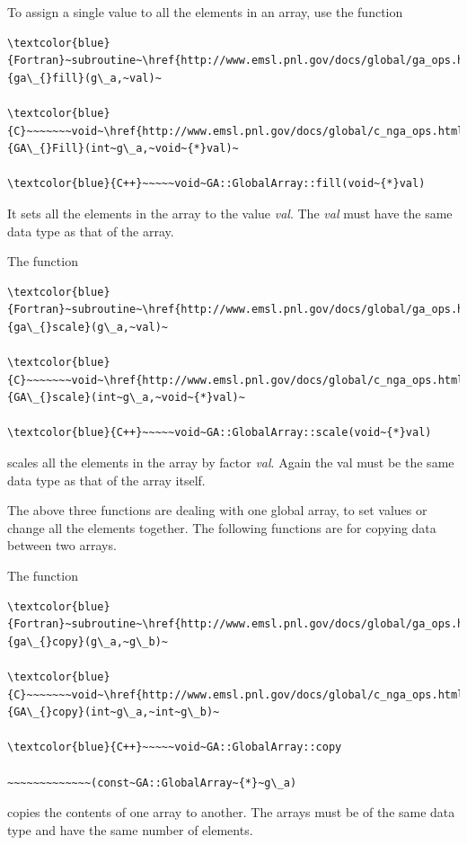 To assign a single value to all the elements in an array, use the
function
\begin{verbatim}
\textcolor{blue}{Fortran}~subroutine~\href{http://www.emsl.pnl.gov/docs/global/ga_ops.html\#ga_fill}{ga\_{}fill}(g\_a,~val)~

\textcolor{blue}{C}~~~~~~~void~\href{http://www.emsl.pnl.gov/docs/global/c_nga_ops.html\#ga_fill}{GA\_{}Fill}(int~g\_a,~void~{*}val)~

\textcolor{blue}{C++}~~~~~void~GA::GlobalArray::fill(void~{*}val)
\end{verbatim}
It sets all the elements in the array to the value \emph{val}. The
\emph{val} must have the same data type as that of the array.

The function
\begin{verbatim}
\textcolor{blue}{Fortran}~subroutine~\href{http://www.emsl.pnl.gov/docs/global/ga_ops.html\#ga_scale}{ga\_{}scale}(g\_a,~val)~

\textcolor{blue}{C}~~~~~~~void~\href{http://www.emsl.pnl.gov/docs/global/c_nga_ops.html\#ga_scale}{GA\_{}scale}(int~g\_a,~void~{*}val)~

\textcolor{blue}{C++}~~~~~void~GA::GlobalArray::scale(void~{*}val)
\end{verbatim}
scales all the elements in the array by factor \emph{val}. Again the
val must be the same data type as that of the array itself.

The above three functions are dealing with one global array, to set
values or change all the elements together. The following functions
are for copying data between two arrays.

The function
\begin{verbatim}
\textcolor{blue}{Fortran}~subroutine~\href{http://www.emsl.pnl.gov/docs/global/ga_ops.html\#ga_copy}{ga\_{}copy}(g\_a,~g\_b)~

\textcolor{blue}{C}~~~~~~~void~\href{http://www.emsl.pnl.gov/docs/global/c_nga_ops.html\#ga_copy}{GA\_{}copy}(int~g\_a,~int~g\_b)~

\textcolor{blue}{C++}~~~~~void~GA::GlobalArray::copy

~~~~~~~~~~~~~(const~GA::GlobalArray~{*}~g\_a)
\end{verbatim}
copies the contents of one array to another. The arrays must be of
the same data type and have the same number of elements.

